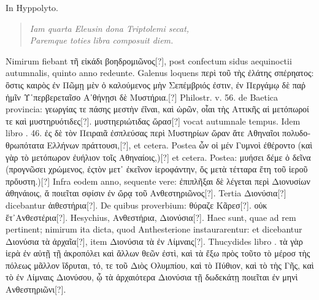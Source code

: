 In Hyppolyto.
\begin{verse}
  \textit{Iam quarta Eleusin dona Triptolemi secat,\\
  Paremque toties libra composuit diem.}
\end{verse}
%
Nimirum fiebant \textgreek{τῆ εἰκάδι βοηδρομιῶνος[?]},
 post confectum sidus aequinoctii
autumnalis, quinto anno redeunte.
Galenus loquens \textgreek{περὶ τοῦ τὴς ἐλάτης
σπέρηατος: ὂστις καιρὸς ἐν Πῶμῃ μὲν ὁ καλούμενος μὴν Σεπέμβριός ἐστιν, ἐν
Περγάμῳ δὲ παῤ ἡμῖν Υ῾περβερεταῖσο Α᾽θήνῃσι δὲ Μυστήρια.[?]}
Philostr. v. 56. de
Baetica provincia: \textgreek{γεωργίας τε πάσης μεστὴν ἐῖναι, καὶ ὡρῶν,
 οἷαι τὴς Αττικῆς αἱ
μετόπωροί τε καὶ μυστηρυότιδες[?]}.
\textgreek{μυστηεριώτιδας ὥρασ[?]} vocat autumnale tempus.
Idem libro . 46.
 \textgreek{ἐς δὲ τὸν Πειραιᾶ ἐσπλεύσας περὶ Μυστηρίων
ὥραν ἅτε Αθηναῖοι πολυδοθρωπότατα Ελλήνων πράττουσι,[?]}, et cetera.
Postea \textgreek{ὧν
οἱ μέν Γυμνοὶ ἐθέροντο (καὶ γὰρ τὸ μετόπωρον ἐυήλιον τοῖς Αθηναίοις,)[?]}
 et cetera.
Postea:
\textgreek{μυήσει δέμε ὁ δεῖνα (προγνῶσει χρώμενος,
 ἐςτὸν μετ᾽ ἐκεῖνον ἱεροφάντην, ὄς μετὰ
τέτταρα ἔτη τοῦ ἱεροῦ πρὄυστη.)[?]}
Infra eodem anno, sequente vere: \textgreek{ἐπιπλῆξαι δὲ λέγεται
περὶ Διονυσίων ἀθηνάιοις, ἅ ποιεῖται σφίσιν ἐν ὤρᾳ τοῦ Ανθεστηριῶνος[?]}.
Tertia
\textgreek{Διονύσια[?]} dicebantur \textgreek{ἀιθεστήρια[?]}.
De quibus proverbium: \textgreek{θύραζε Κᾶρεσ[?]}.
\textgreek{οὐκ ἔτ᾽Ανθεστέρια[?]}.
Hesychius, \textgreek{Ανθεστήρια, Διονύσια[?]}.
Haec sunt, quae ad rem
pertinent; nimirum ita dicta, quod Anthesterione instaurarentur: et
dicebantur \textgreek{Διονύσια τὰ ἀρχαῖα[?]},
 item \textgreek{Διονύσια τὰ ἐν Λίμναις[?]}.
Thucydides
libro . \textgreek{τὰ γὰρ ἱερὰ ἐν αὐτῇ τῇ ἀκροπόλει καὶ ἄλλων θεῶν ἐστὶ,
 καὶ τὰ ἔξω πρὸς
τοῦτο τὸ μέροσ τὴς πόλεως μᾶλλον ἵδρυται, τό, τε τοῦ Διὸς Ολυμπίου, καὶ τὸ Πύθιον,
καὶ τὸ τὴς Γῆς, καὶ τὸ ἐν Λίμναις Διονύσου, ᾧ τὰ ἀρχαιότερα Διονύσια τῇ δωδεκάτῃ
ποιεῖται ἐν μηνὶ Ανθεστηριῶνι[?]}.
